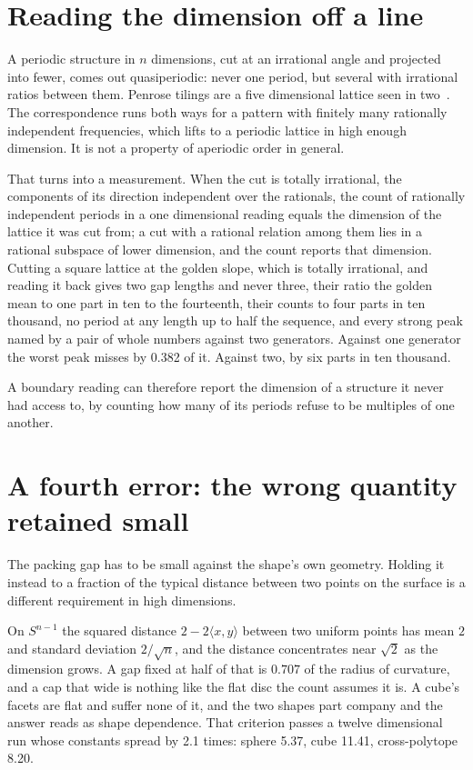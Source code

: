 \section{Reading the dimension off a line}

A periodic structure in $n$ dimensions, cut at an irrational angle and projected into fewer, comes
out quasiperiodic: never one period, but several with irrational ratios between them. Penrose
tilings are a five dimensional lattice seen in two~\cite{src:de-Bruijn-1981}. The correspondence runs both ways for a pattern
with finitely many rationally independent frequencies, which lifts to a periodic lattice in high
enough dimension. It is not a property of aperiodic order in general.

That turns into a measurement. When the cut is totally irrational, the components of its direction
independent over the rationals, the count of rationally independent periods in a one dimensional
reading equals the dimension of the lattice it was cut from; a cut with a rational relation among
them lies in a rational subspace of lower dimension, and the count reports that dimension. Cutting
a square lattice at the golden slope, which is totally irrational, and reading it back gives two
gap lengths and never three, their ratio the golden mean to one part in ten to the fourteenth, their
counts to four parts in ten thousand, no period at any length up to half the sequence, and every
strong peak named by a pair of whole numbers against two generators. Against one generator the
worst peak misses by 0.382 of it. Against two, by six parts in ten thousand.

A boundary reading can therefore report the dimension of a structure it never had access to, by counting
how many of its periods refuse to be multiples of one another.

\section{A fourth error: the wrong quantity retained small}

The packing gap has to be small against the shape's own geometry. Holding it instead to a fraction
of the typical distance between two points on the surface is a different requirement in high
dimensions.

On $S^{n-1}$ the squared distance $2 - 2\langle x, y\rangle$ between two uniform points has mean $2$
and standard deviation $2/\sqrt{n}$, and the distance concentrates near $\sqrt{2}$ as the dimension
grows. A gap fixed at half of that is $0.707$ of the radius of curvature, and a cap that wide is
nothing like the flat disc the count assumes it is. A cube's facets are flat and suffer none of it,
and the two shapes part company and the answer reads as shape dependence. That criterion passes a
twelve dimensional run whose constants spread by 2.1 times: sphere 5.37, cube 11.41, cross-polytope
8.20.

